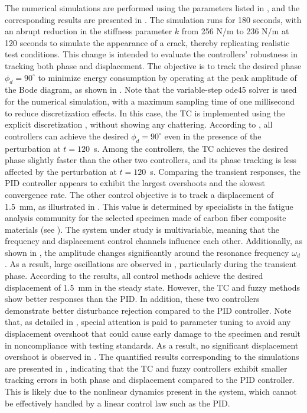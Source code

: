 \documentclass[lettersize,journal]{IEEEtran}
\begin{document}
The numerical simulations are performed using the parameters listed in , and the corresponding results are presented in . The simulation runs for 180 seconds, with an abrupt reduction in the stiffness parameter $k$ from 256 N/m to 236 N/m at 120 seconds to simulate the appearance of a crack, thereby replicating realistic test conditions. This change is intended to evaluate the controllers' robustness in tracking both phase and displacement. The objective is to track the desired phase $\phi_d = 90^\circ$ to minimize energy consumption by operating at the peak amplitude of the Bode diagram, as shown in . Note that the variable-step {\selectfont ode45} solver is used for the numerical simulation, with a maximum sampling time of one millisecond to reduce discretization effects. In this case, the TC is implemented using the explicit discretization , without showing any chattering.
According to , all controllers can achieve the desired $\phi_d = 90^\circ$ even in the presence of the perturbation at $t = 120$~s. Among the controllers, the TC achieves the desired phase slightly faster than the other two controllers, and its phase tracking is less affected by the perturbation at $t = 120$~s. Comparing the transient responses, the PID controller appears to exhibit the largest overshoots and the slowest convergence rate.
The other control objective is to track a displacement of 1.5~mm, as illustrated in . This value is determined by specialists in the fatigue analysis community for the selected specimen made of carbon fiber composite materials (see ). The system under study is multivariable, meaning that the frequency and displacement control channels influence each other. Additionally, as shown in , the amplitude changes significantly around the resonance frequency $\omega_d$. As a result, large oscillations are observed in , particularly during the transient phase. According to the results, all control methods achieve the desired displacement of 1.5~mm in the steady state. However, the TC and fuzzy methods show better responses than the PID. In addition, these two controllers demonstrate better disturbance rejection compared to the PID controller. Note that, as detailed in , special attention is paid to parameter tuning to avoid any displacement overshoot that could cause early damage to the specimen and result in noncompliance with testing standards. As a result, no significant displacement overshoot is observed in . The quantified results corresponding to the simulations are presented in , indicating that the TC and fuzzy controllers exhibit smaller tracking errors in both phase and displacement compared to the PID controller. This is likely due to the nonlinear dynamics present in the system, which cannot be effectively handled by a linear control law such as the PID.
\end{document}
